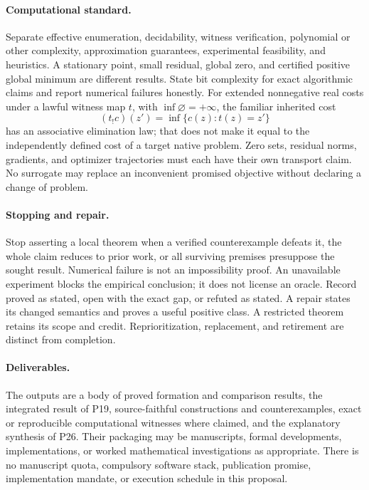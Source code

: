 \documentclass[11pt]{article}
\theoremstyle{definition}
\begin{document}
\paragraph{Computational standard.}
Separate effective enumeration, decidability, witness verification, polynomial or other complexity, approximation guarantees, experimental feasibility, and heuristics. A stationary point, small residual, global zero, and certified positive global minimum are different results. State bit complexity for exact algorithmic claims and report numerical failures honestly. For extended nonnegative real costs under a lawful witness map $t$, with $\inf\varnothing=+\infty$, the familiar inherited cost
\[
 (t_!c)(z')=\inf\{c(z):t(z)=z'\}
\]
has an associative elimination law; that does not make it equal to the independently defined cost of a target native problem. Zero sets, residual norms, gradients, and optimizer trajectories must each have their own transport claim. No surrogate may replace an inconvenient promised objective without declaring a change of problem.

\paragraph{Stopping and repair.}
Stop asserting a local theorem when a verified counterexample defeats it, the whole claim reduces to prior work, or all surviving premises presuppose the sought result. Numerical failure is not an impossibility proof. An unavailable experiment blocks the empirical conclusion; it does not license an oracle. Record proved as stated, open with the exact gap, or refuted as stated. A repair states its changed semantics and proves a useful positive class. A restricted theorem retains its scope and credit. Reprioritization, replacement, and retirement are distinct from completion.

\paragraph{Deliverables.}
The outputs are a body of proved formation and comparison results, the integrated result of P19, source-faithful constructions and counterexamples, exact or reproducible computational witnesses where claimed, and the explanatory synthesis of P26. Their packaging may be manuscripts, formal developments, implementations, or worked mathematical investigations as appropriate. There is no manuscript quota, compulsory software stack, publication promise, implementation mandate, or execution schedule in this proposal.
\end{document}
